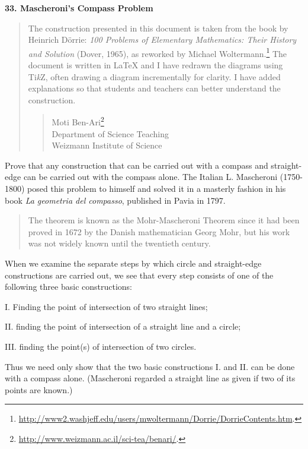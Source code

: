 \documentclass[11pt,a4paper]{article}
\begin{document}
\textbf{\LARGE 33. Mascheroni's Compass Problem}

\begin{quote}
The construction presented in this document is taken from the book by Heinrich D\"{o}rrie: \textit{100 Problems of Elementary Mathematics: Their History and Solution} (Dover, 1965), as reworked by Michael Woltermann.\footnote{\url{http://www2.washjeff.edu/users/mwoltermann/Dorrie/DorrieContents.htm}.} The document is written in \LaTeX{} and I have redrawn the diagrams using Ti\textit{k}Z, often drawing a diagram incrementally for clarity. I have added explanations so that students and teachers can better understand the construction.

\begin{quote}
Moti Ben-Ari\footnote{\url{http://www.weizmann.ac.il/sci-tea/benari/}.}\\
Department of Science Teaching\\
Weizmann Institute of Science
\end{quote}
\end{quote}


Prove that any construction that can be carried out with a compass and straight-edge can be carried out with the compass alone. The Italian L. Mascheroni (1750-1800) posed this problem to himself and solved it in a masterly fashion in his book \textit{La geometria del compasso}, published in Pavia in 1797.

\begin{quote}
The theorem is known as the Mohr-Mascheroni Theorem since it had been proved in 1672 by the Danish mathematician Georg Mohr, but his work was not widely known until the twentieth century.
\end{quote}

When we examine the separate steps by which circle and straight-edge constructions are carried out, we see that every step consists of one of the following three basic constructions:

I. Finding the point of intersection of two straight lines;

II. finding the point of intersection of a straight line and a circle;

III. finding the point(s) of intersection of two circles.

Thus we need only show that the two basic constructions I. and II. can be done with a compass alone. (Mascheroni regarded a straight line as given if two of its points are known.)
\end{document}
